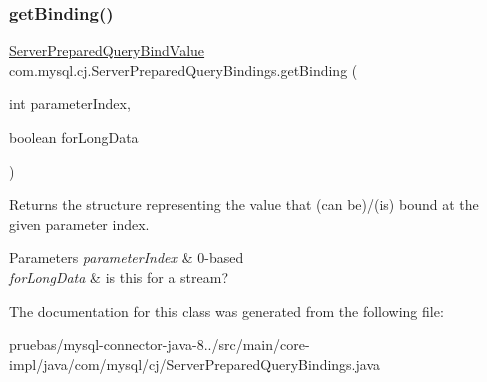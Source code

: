 \subsubsection{\texorpdfstring{get\+Binding()}{getBinding()}}
{\footnotesize\ttfamily \mbox{\hyperlink{classcom_1_1mysql_1_1cj_1_1_server_prepared_query_bind_value}{Server\+Prepared\+Query\+Bind\+Value}} com.\+mysql.\+cj.\+Server\+Prepared\+Query\+Bindings.\+get\+Binding (\begin{DoxyParamCaption}\item[{int}]{parameter\+Index,  }\item[{boolean}]{for\+Long\+Data }\end{DoxyParamCaption})}

Returns the structure representing the value that (can be)/(is) bound at the given parameter index.


\begin{DoxyParams}{Parameters}
{\em parameter\+Index} & 0-\/based \\
\hline
{\em for\+Long\+Data} & is this for a stream? \\
\hline
\end{DoxyParams}


The documentation for this class was generated from the following file\+:\begin{DoxyCompactItemize}
\item 
pruebas/mysql-\/connector-\/java-\/8../src/main/core-\/impl/java/com/mysql/cj/Server\+Prepared\+Query\+Bindings.\+java\end{DoxyCompactItemize}
